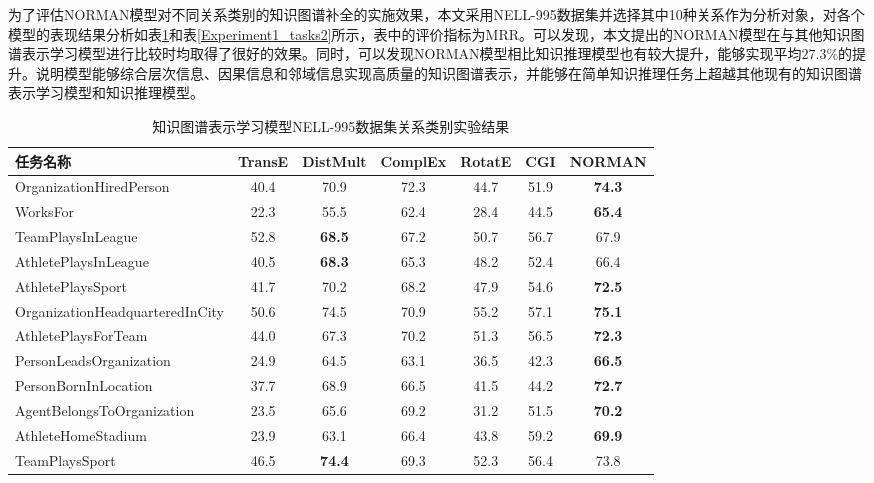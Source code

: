 \documentclass[algorithmlist, AutoFakeBold, AutoFakeSlant, figurelist, tablelist, nomlist, engineering]{seuthesix}
\begin{document}
为了评估NORMAN模型对不同关系类别的知识图谱补全的实施效果，本文采用NELL-995数据集并选择其中10种关系作为分析对象，对各个模型的表现结果分析如表\ref{Experiment1_tasks1}和表\ref{Experiment1_tasks2}所示，表中的评价指标为MRR。可以发现，本文提出的NORMAN模型在与其他知识图谱表示学习模型进行比较时均取得了很好的效果。同时，可以发现NORMAN模型相比知识推理模型也有较大提升，能够实现平均$27.3\%$的提升。说明模型能够综合层次信息、因果信息和邻域信息实现高质量的知识图谱表示，并能够在简单知识推理任务上超越其他现有的知识图谱表示学习模型和知识推理模型。
\begin{table}[]
  \centering
  \begin{tabular*}{0.95\textwidth}{@{\extracolsep{\fill}}lcccccc}
  \toprule[1pt]
  \small{任务名称} & \small{TransE} & \small{DistMult} & \small{ComplEx} & \small{RotatE} & \small{CGI} & \small{NORMAN} \\ \hline
  \small{OrganizationHiredPerson} & 40.4 & 70.9 & 72.3 & 44.7 & 51.9 & \textbf{74.3} \\
  \small{WorksFor} & 22.3 & 55.5 & 62.4 & 28.4 & 44.5 & \textbf{65.4} \\
  \small{TeamPlaysInLeague} & 52.8 & \textbf{68.5} & 67.2 & 50.7 & 56.7 & 67.9 \\
  \small{AthletePlaysInLeague} & 40.5 & \textbf{68.3} & 65.3 & 48.2 & 52.4 & 66.4 \\
  \small{AthletePlaysSport} & 41.7 & 70.2 & 68.2 & 47.9 & 54.6 & \textbf{72.5} \\
  \small{OrganizationHeadquarteredInCity} & 50.6 & 74.5 & 70.9 & 55.2 & 57.1 & \textbf{75.1} \\
  \small{AthletePlaysForTeam} & 44.0 & 67.3 & 70.2 & 51.3 & 56.5 & \textbf{72.3} \\
  \small{PersonLeadsOrganization} & 24.9 & 64.5 & 63.1 & 36.5 & 42.3 & \textbf{66.5} \\
  \small{PersonBornInLocation} & 37.7 & 68.9 & 66.5 & 41.5 & 44.2 & \textbf{72.7} \\
  \small{AgentBelongsToOrganization} & 23.5 & 65.6 & 69.2 & 31.2 & 51.5 & \textbf{70.2} \\
  \small{AthleteHomeStadium} & 23.9 & 63.1 & 66.4 & 43.8 & 59.2 & \textbf{69.9} \\
  \small{TeamPlaysSport} & 46.5 & \textbf{74.4} & 69.3 & 52.3 & 56.4 & 73.8 \\
  \bottomrule[1pt]
  \end{tabular*}
  \caption{知识图谱表示学习模型NELL-995数据集关系类别实验结果}
  \label{Experiment1_tasks1}
\end{table}
\end{document}
